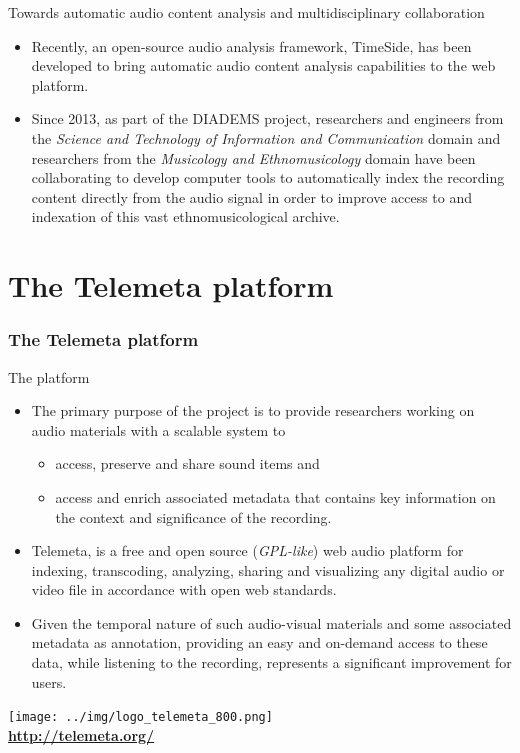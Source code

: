 \documentclass[final, hyperref, table]{beamer}
\begin{document}
\begin{frame}
\begin{block}{Towards automatic audio content analysis and multidisciplinary collaboration}
  \begin{itemize}
  \item Recently, an open-source audio analysis framework,
    TimeSide, has been developed to bring automatic audio content
    analysis capabilities to the web platform.
  \item Since 2013, as part of the DIADEMS project, researchers and engineers from the \emph{Science and Technology of Information and Communication} domain and researchers from the \emph{Musicology and Ethnomusicology} domain have been collaborating to develop computer tools to automatically index the recording content directly from the audio signal in order to improve access to and indexation of this vast ethnomusicological archive.
  \end{itemize}

\end{block}

\end{frame}
\section[Telemeta]{The Telemeta platform}\label{sec:Telemeta}
\begin{frame}
\frametitle{The Telemeta platform}
\begin{block}{The platform}
  \begin{itemize}
  \item The primary purpose of the project is to provide researchers working on audio materials with a scalable system to
    \begin{itemize}\footnotesize
    \item access, preserve and share \alert{sound items} and
    \item access and enrich \alert{associated metadata} that contains
      key information on the context and significance of the
      recording.
    \end{itemize}

  \item Telemeta, is a free and open source (\emph{GPL-like}) web audio platform for indexing, transcoding, analyzing, sharing and visualizing any digital audio or video file in accordance with open web standards.
  \item Given the temporal nature of such audio-visual materials and some associated metadata as annotation, providing an easy and on-demand access to these data, while listening to the recording, represents a significant improvement for users.
  \end{itemize}
\vspace{-0.5cm}
    \begin{center}
      \texttt{[image: ../img/logo\_telemeta\_800.png]}\\
      \colorbox{yellow!50}{\textbf{\url{http://telemeta.org/}}}
    \end{center}
  \end{block}
\end{frame}
\end{document}
